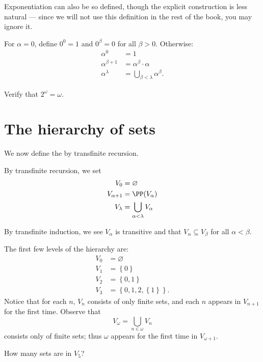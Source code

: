 Exponentiation can also be so defined, though the explicit construction is less natural ---
since we will not use this definition in the rest of the book, you may ignore it.

For $\alpha = 0$, define $0^0 = 1$ and $0^\beta = 0$ for all $\beta > 0$. Otherwise:
\begin{align*}
	\alpha^0 &= 1 \\
	\alpha^{\beta+1} &= \alpha^{\beta} \cdot \alpha \\
	\alpha^{\lambda} &= \bigcup_{\beta < \lambda} \alpha^\beta.
\end{align*}
\begin{exercise}
	Verify that $2^\omega = \omega$.
\end{exercise}


\section{The hierarchy of sets}
We now define the  by transfinite recursion.
\begin{definition}
	By transfinite recursion, we set
	\begin{align*}
		V_0 &= \varnothing \\
		V_{\alpha + 1} &= \PP(V_\alpha) \\
		V_\lambda &= \bigcup_{\alpha<\lambda} V_\alpha
	\end{align*}
\end{definition}
By transfinite induction, we see $V_\alpha$ is transitive
and that $V_\alpha \subseteq V_\beta$ for all $\alpha < \beta$.

\begin{example}
	The first few levels of the hierarchy are:
	\begin{align*}
		V_0 &= \varnothing \\
		V_1 &= \left\{ 0 \right\} \\
		V_2 &=  \left\{ 0, 1 \right\} \\
		V_3 &= \left\{ 0, 1, 2, \left\{ 1 \right\} \right\}.
	\end{align*}
	Notice that for each $n$, $V_n$ consists of only finite sets,
	and each $n$ appears in $V_{n+1}$ for the first time.
	Observe that
	\[ V_\omega = \bigcup_{n \in \omega} V_n \]
	consists only of finite sets; thus $\omega$ appears for the first time
	in $V_{\omega+1}$.
\end{example}
\begin{ques}
	How many sets are in $V_5$?
\end{ques}

